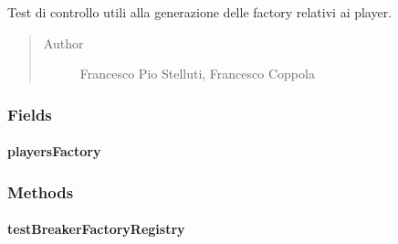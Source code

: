 \documentclass[letterpaper,10pt,italian]{sphinxmanual}
\begin{document}
\begin{fulllineitems}
\label{\detokenize{test/it/unicam/cs/pa/mastermind/test/PlayersFactoryRegistry:it.unicam.cs.pa.mastermind.test.PlayersFactoryRegistry}}
Test di controllo utili alla generazione delle factory relativi ai player.
\begin{quote}\begin{description}
\item[{Author}] \leavevmode
Francesco Pio Stelluti, Francesco Coppola

\end{description}\end{quote}

\end{fulllineitems}



\subsubsection{Fields}
\label{\detokenize{test/it/unicam/cs/pa/mastermind/test/PlayersFactoryRegistry:fields}}

\paragraph{playersFactory}
\label{\detokenize{test/it/unicam/cs/pa/mastermind/test/PlayersFactoryRegistry:playersfactory}}

\begin{fulllineitems}
\label{\detokenize{test/it/unicam/cs/pa/mastermind/test/PlayersFactoryRegistry:it.unicam.cs.pa.mastermind.test.PlayersFactoryRegistry.playersFactory}}
\end{fulllineitems}



\subsubsection{Methods}
\label{\detokenize{test/it/unicam/cs/pa/mastermind/test/PlayersFactoryRegistry:methods}}

\paragraph{testBreakerFactoryRegistry}
\label{\detokenize{test/it/unicam/cs/pa/mastermind/test/PlayersFactoryRegistry:testbreakerfactoryregistry}}
\end{document}
